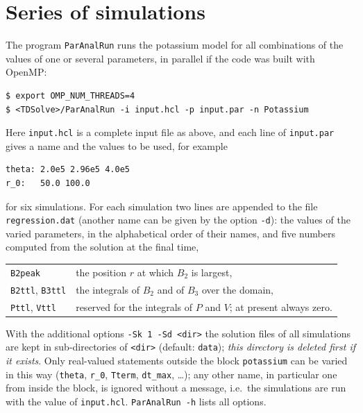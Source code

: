 \documentclass[11pt]{article}
\newcommand{\code}[1]{\texttt{#1}}
\begin{document}
\section{Series of simulations}
\label{sec:paranal}
The program \code{ParAnalRun} runs the potassium model for all combinations of the values of one or several parameters, in parallel if the code was built with OpenMP:
\begin{lstlisting}
$ export OMP_NUM_THREADS=4
$ <TDSolve>/ParAnalRun -i input.hcl -p input.par -n Potassium
\end{lstlisting}
Here \code{input.hcl} is a complete input file as above, and each line of \code{input.par} gives a name and the values to be used, for example
\begin{lstlisting}
theta: 2.0e5 2.96e5 4.0e5
r_0:   50.0 100.0
\end{lstlisting}
for six simulations.
For each simulation two lines are appended to the file \code{regression.dat} (another name can be given by the option \code{-d}): the values of the varied parameters, in the alphabetical order of their names, and five numbers computed from the solution at the final time,
\begin{center}
\begin{tabular}{ll}
  \code{B2peak} & the position $r$ at which $B_2$ is largest, \\
  \code{B2ttl}, \code{B3ttl} & the integrals of $B_2$ and of $B_3$ over the domain, \\
  \code{Pttl}, \code{Vttl} & reserved for the integrals of $P$ and $V$; at present always zero.
\end{tabular}
\end{center}
With the additional options \code{-Sk 1 -Sd <dir>} the solution files of all simulations are kept in sub-directories of \code{<dir>} (default: \code{data}); \emph{this directory is deleted first if it exists}.
Only real-valued statements outside the block \code{potassium} can be varied in this way (\code{theta}, \code{r\_0}, \code{Tterm}, \code{dt\_max}, \ldots); any other name, in particular one from inside the block, is ignored without a message, i.e.\ the simulations are run with the value of \code{input.hcl}.
\code{ParAnalRun -h} lists all options.
\end{document}
